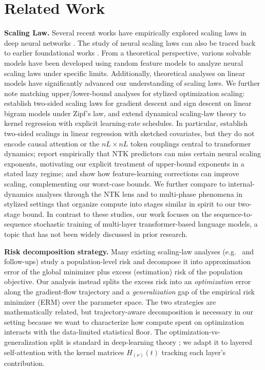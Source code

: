\documentclass[11pt]{article}
\let\citet\citep
\theoremstyle{plain}
\begin{document}
\section{Related Work}\label{sec:ralted_work}
{\bf Scaling Law.}
Several recent works have empirically explored scaling laws in deep neural networks \citep{kmh+20, hbm+22, rfcs21, hna+17, rrbs19, hka+20, mka18, mas+23, sos+22, niu2024beyond, ivgi2022scaling, petrov2025closing, mehta2025scaling, bi2025scaling, cagnetta2025scaling, havrilla2024understanding, kas+25}. The study of neural scaling laws can also be traced back to earlier foundational works \citep{cd07, shs+09, at88}. From a theoretical perspective, various solvable models have been developed using random feature models \citep{bdk+24, mrs22, abp+21, azvp24, bap24, ppxp24, dlm24, clkz21} to analyze neural scaling laws under specific limits. Additionally, theoretical analyses on linear models \citep{whs22, bcp20, sk22, bp21, lwk+24, lwz25} have significantly advanced our understanding of scaling laws. We further note matching upper/lower-bound analyses for stylized optimization scaling: \citet{kb25} establish two-sided scaling laws for gradient descent and sign descent on linear bigram models under Zipf's law, and \citet{azpf25} extend dynamical scaling-law theory to kernel regression with explicit learning-rate schedules. In particular, \citet{lwk+24} establish two-sided scalings in linear regression with sketched covariates, but they do not encode causal attention or the $nL\times nL$ token couplings central to transformer dynamics; \citet{vbn22} report empirically that NTK predictors can miss certain neural scaling exponents, motivating our explicit treatment of upper-bound exponents in a stated lazy regime; and \citet{boc+25} show how feature-learning corrections can improve scaling, complementing our worst-case bounds. We further compare to internal-dynamics analyses through the NTK lens \citep{nik+25} and to multi-phase phenomena in stylized settings \citep{lyu+23} that organize compute into stages similar in spirit to our two-stage bound. In contrast to these studies, our work focuses on the sequence-to-sequence stochastic training of multi-layer transformer-based language models, a topic that has not been widely discussed in prior research.

{\bf Risk decomposition strategy.}
Many existing scaling-law analyses (e.g.~\citep{lwk+24} and follow-ups) study a population-level risk and decompose it into approximation error of the global minimizer plus excess (estimation) risk of the population objective. Our analysis instead splits the excess risk into an {\it optimization} error along the gradient-flow trajectory and a {\it generalization} gap of the empirical risk minimizer (ERM) over the parameter space. The two strategies are mathematically related, but trajectory-aware decomposition is necessary in our setting because we want to characterize how compute spent on optimization interacts with the data-limited statistical floor. The optimization-vs-generalization split is standard in deep-learning theory \citep{dzps19, adh+19}; we adapt it to layered self-attention with the kernel matrices $H_{(\nu)}(t)$ tracking each layer's contribution.
\end{document}
